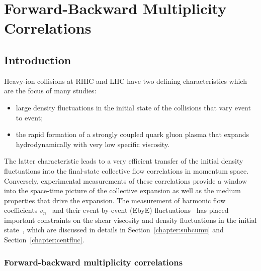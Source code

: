 \section{Forward-Backward Multiplicity Correlations}
\label{chapter:fbcorr}

\subsection{Introduction}

Heavy-ion collisions at RHIC and LHC have two defining characteristics which are the focus of many studies:
\begin{itemize}
\item large density fluctuations in the initial state of the collisions that vary event to event;
\item the rapid formation of a strongly coupled quark gluon plasma that expands hydrodynamically with very low specific viscosity.
\end{itemize}
The latter characteristic leads to a very efficient transfer of the initial density fluctuations into the final-state collective flow correlations in momentum space. Conversely, experimental measurements of these correlations provide a window into the space-time picture of the collective expansion as well as the medium properties that drive the expansion. The measurement of harmonic flow coefficients $v_n$~\cite{Adare:2014kci, ALICE:2011ab, ATLAS:2012at, Chatrchyan:2013kba} and their event-by-event (EbyE) fluctuations~\cite{Aad:2013xma, Aad:2014fla, Aad:2015lwa} has placed important constraints on the shear viscosity and density fluctuations in the initial state~\cite{Luzum:2013yya, Gale:2013da, Heinz:2013th, Jia:2014jca}, which are discussed in details in Section~\ref{chapter:subcumu} and Section~\ref{chapter:centfluc}.



\subsubsection{Forward-backward multiplicity correlations}

